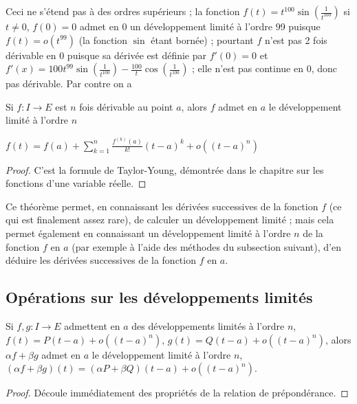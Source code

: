 \begin{rem}
Ceci ne s'étend pas à des ordres supérieurs ; la fonction $f(t) = t^{100} \sin(\frac{1}{t^{100}})$ si $t \neq 0$, $f(0) = 0$ admet en 0 un développement limité à l'ordre 99 puisque $f(t) = o(t^{99})$ (la fonction $\sin$ étant bornée) ; pourtant $f$ n'est pas 2 fois dérivable en 0 puisque sa dérivée est définie par $f'(0) = 0$ et $f'(x) = 100t^{99} \sin(\frac{1}{t^{100}}) - \frac{100}{t} \cos(\frac{1}{t^{100}})$ ; elle n'est pas continue en 0, donc pas dérivable. Par contre on a
\end{rem}

\begin{thm}
Si $f : I \rightarrow E$ est $n$ fois dérivable au point $a$, alors $f$ admet en $a$ le développement limité à l'ordre $n$

$f(t) = f(a) + \sum_{k=1}^n \frac{f^{(k)}(a)}{k!} (t - a)^k + o((t - a)^n)$
\end{thm}

\begin{proof}
C'est la formule de Taylor-Young, démontrée dans le chapitre sur les fonctions d'une variable réelle.
\end{proof}

\begin{rem}
Ce théorème permet, en connaissant les dérivées successives de la fonction $f$ (ce qui est finalement assez rare), de calculer un développement limité ; mais cela permet également en connaissant un développement limité à l'ordre $n$ de la fonction $f$ en $a$ (par exemple à l'aide des méthodes du subsection suivant), d'en déduire les dérivées successives de la fonction $f$ en $a$.
\end{rem}

\subsection{Opérations sur les développements limités}

\begin{prop}
Si $f,g : I \rightarrow E$ admettent en $a$ des développements limités à l'ordre $n$, $f(t) = P(t - a) + o((t - a)^n)$, $g(t) = Q(t - a) + o((t - a)^n)$, alors $\alpha f + \beta g$ admet en $a$ le développement limité à l'ordre $n$, $(\alpha f + \beta g)(t) = (\alpha P + \beta Q)(t - a) + o((t - a)^n)$.
\end{prop}

\begin{proof}
Découle immédiatement des propriétés de la relation de prépondérance.
\end{proof}

